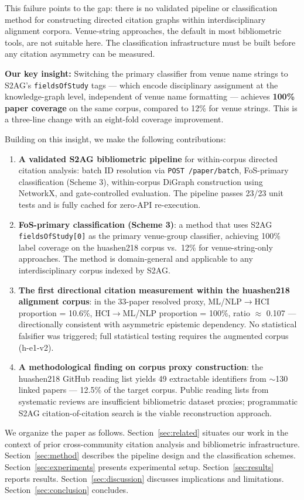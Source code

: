 This failure points to the gap: there is no validated pipeline or classification method for constructing directed citation graphs within interdisciplinary alignment corpora.
Venue-string approaches, the default in most bibliometric tools, are not suitable here.
The classification infrastructure must be built before any citation asymmetry can be measured.

\textbf{Our key insight:} Switching the primary classifier from venue name strings to S2AG's \texttt{fieldsOfStudy} tags --- which encode disciplinary assignment at the knowledge-graph level, independent of venue name formatting --- achieves \textbf{100\% paper coverage} on the same corpus, compared to 12\% for venue strings. This is a three-line change with an eight-fold coverage improvement.

Building on this insight, we make the following contributions:

\begin{enumerate}
\item \textbf{A validated S2AG bibliometric pipeline} for within-corpus directed citation analysis: batch ID resolution via \texttt{POST /paper/batch}, FoS-primary classification (Scheme 3), within-corpus DiGraph construction using NetworkX, and gate-controlled evaluation. The pipeline passes 23/23 unit tests and is fully cached for zero-API re-execution.

\item \textbf{FoS-primary classification (Scheme 3)}: a method that uses S2AG \texttt{fieldsOfStudy[0]} as the primary venue-group classifier, achieving 100\% label coverage on the huashen218 corpus vs.\ 12\% for venue-string-only approaches. The method is domain-general and applicable to any interdisciplinary corpus indexed by S2AG.

\item \textbf{The first directional citation measurement within the huashen218 alignment corpus}: in the 33-paper resolved proxy, ML/NLP$\to$HCI proportion = 10.6\%, HCI$\to$ML/NLP proportion = 100\%, ratio $\approx$ 0.107 --- directionally consistent with asymmetric epistemic dependency. No statistical falsifier was triggered; full statistical testing requires the augmented corpus (h-e1-v2).

\item \textbf{A methodological finding on corpus proxy construction}: the huashen218 GitHub reading list yields 49 extractable identifiers from $\sim$130 linked papers --- 12.5\% of the target corpus. Public reading lists from systematic reviews are insufficient bibliometric dataset proxies; programmatic S2AG citation-of-citation search is the viable reconstruction approach.
\end{enumerate}

We organize the paper as follows.
Section~\ref{sec:related} situates our work in the context of prior cross-community citation analysis and bibliometric infrastructure.
Section~\ref{sec:method} describes the pipeline design and the classification schemes.
Section~\ref{sec:experiments} presents experimental setup.
Section~\ref{sec:results} reports results.
Section~\ref{sec:discussion} discusses implications and limitations.
Section~\ref{sec:conclusion} concludes.

